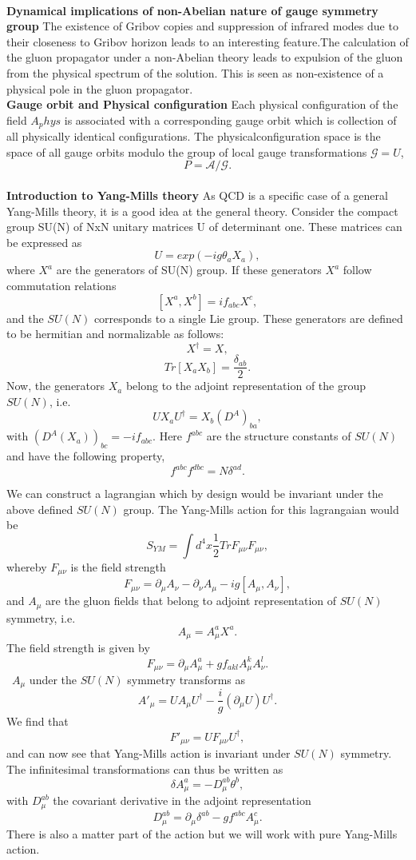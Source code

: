 \begin{description}
\\
\textbf{Dynamical implications of non-Abelian nature of gauge symmetry group}
The existence of Gribov copies and suppression of infrared modes due to their closeness to Gribov horizon leads to an interesting feature.The calculation of the gluon propagator under a non-Abelian theory leads to expulsion of the gluon from the physical spectrum of the solution. This is seen as non-existence of a physical pole in the gluon propagator.
\\
\textbf{Gauge orbit and Physical configuration}
Each physical configuration of the field $ A_phys $ is associated with a corresponding gauge orbit which is collection of all physically identical configurations. The physicalconfiguration space is the space of all gauge orbits modulo the group of local gauge transformations $\mathcal{G}={U}$, $$P=\mathcal{A}/\mathcal{G}.$$
\\

\textbf{Introduction to Yang-Mills theory}
As QCD is a specific case of a general Yang-Mills theory, it is a good idea at the general theory. Consider the compact group SU(N) of NxN unitary matrices U of determinant one. These matrices can be expressed as $$U = exp(-ig\theta_{a}X_{a}),$$ where $X^{a}$ are the generators of SU(N) group. If these generators $X^{a}$ follow commutation relations $$[X^{a},X^{b}]=i f_{abc}X^{c},$$ and the $SU(N)$ corresponds to a single Lie group. These generators are defined to be hermitian and normalizable as follows: $$X^{\dagger}=X,$$ $$Tr[X_{a}X_{b}]=\frac{\delta_{ab}}{2}.$$
Now, the generators $X_{a}$ belong to the adjoint representation of the group $SU(N)$, i.e. $$U X_{a}U^{\dagger}=X_{b} (D^{A})_{ba},$$ with $(D^{A}(X_{a}))_{bc}=-if_{abc}$. Here $f^{abc}$ are the structure constants of $SU(N)$ and have the following property, $$f^{abc}f^{dbc}=N \delta^{ad}.$$

We can construct a lagrangian which by design would be invariant under the above defined $SU(N)$ group. The Yang-Mills action for this lagrangaian would be $$S_{YM}=\int d^{4}x \frac{1}{2} Tr F_{\mu\nu}F_{\mu\nu},$$ whereby $F_{\mu\nu}$ is the field strength $$ F_{\mu\nu}=\partial_{\mu}A_{\nu}-\partial_{\nu}A_{\mu}-ig[A_{\mu},A_{\nu}],$$ and $A_{\mu}$ are the gluon fields that belong to adjoint representation of $SU(N)$ symmetry, i.e. $$A_{\mu}=A^{a}_{\mu}X^{a}.$$ The field strength is given by $$F_{\mu\nu}=\partial_{\mu}A^{a}_{\mu}+gf_{akl}A^{k}_{\mu}A^{l}_{\nu}.$$ \ $A_{\mu}$ under the $SU(N)$ symmetry transforms as $$ A'_{\mu}=UA_{\mu}U^{\dagger}-\frac{i}{g}(\partial_{\mu}U)U^{\dagger}.$$ We find that $$F'_{\mu\nu}=U F_{\mu\nu}U^{\dagger},$$ and can now see that Yang-Mills action is invariant under $SU(N)$ symmetry. The infinitesimal transformations can thus be written as $$\delta A^{a}_{\mu}=-D^{ab}_{\mu}\theta^{b},$$ with $D^{ab}_{\mu}$ the covariant derivative in the adjoint representation $$ D^{ab}_{\mu}=\partial_{\mu}\delta^{ab}-g f^{abc}A^{c}_{\mu}.$$ There is also a matter part of the action but we will work with pure Yang-Mills action.


\end{description}
